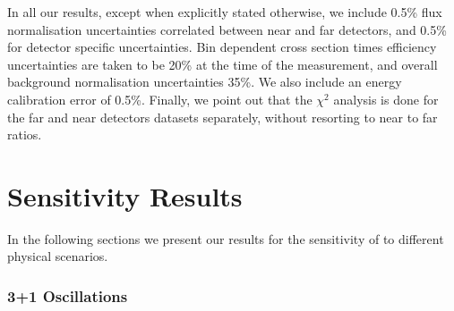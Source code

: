 In all our results, except when explicitly stated otherwise, we include 0.5\% flux normalisation uncertainties correlated between near and far detectors, and 0.5\% for detector specific uncertainties. Bin dependent cross section times efficiency uncertainties are taken to be 20\% at the time of the measurement, and overall background normalisation uncertainties 35\%. We also include an energy calibration error of 0.5\%. Finally, we point out that the $\chi^2$ analysis is done for the far and near detectors datasets separately, without resorting to near to far ratios.
 
\section{Sensitivity Results}

In the following sections we present our results for the sensitivity of \nus to different physical scenarios. 

\subsubsection{3+1 Oscillations}

